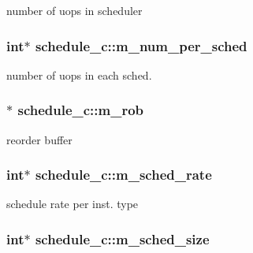 \label{classschedule__c_a28362ea19de72375832f204b8d447237}
number of uops in scheduler \hypertarget{classschedule__c_a38b31f54c703cfde77a130c7a0cf2b9d}{
\subsubsection[{m\_\-num\_\-per\_\-sched}]{\setlength{\rightskip}{0pt plus 5cm}int$\ast$ {\bf schedule\_\-c::m\_\-num\_\-per\_\-sched}}}
\label{classschedule__c_a38b31f54c703cfde77a130c7a0cf2b9d}
number of uops in each sched. \hypertarget{classschedule__c_a440a3a31b8fd41afae103a4b0ed3f49c}{
\subsubsection[{m\_\-rob}]{$\ast$ {\bf schedule\_\-c::m\_\-rob}}}
\label{classschedule__c_a440a3a31b8fd41afae103a4b0ed3f49c}
reorder buffer \hypertarget{classschedule__c_a04f5ccf337d6b385a6c50ed669343096}{
\subsubsection[{m\_\-sched\_\-rate}]{\setlength{\rightskip}{0pt plus 5cm}int$\ast$ {\bf schedule\_\-c::m\_\-sched\_\-rate}}}
\label{classschedule__c_a04f5ccf337d6b385a6c50ed669343096}
schedule rate per inst. type \hypertarget{classschedule__c_a3d8d6881abaa41ccccf6f173a23cc2bd}{
\subsubsection[{m\_\-sched\_\-size}]{\setlength{\rightskip}{0pt plus 5cm}int$\ast$ {\bf schedule\_\-c::m\_\-sched\_\-size}}}
